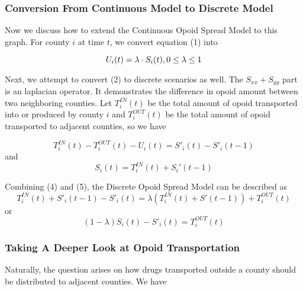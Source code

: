 \subsubsection{Conversion From Continuous Model to Discrete Model}
Now we discuss how to extend the Continuous Opoid Spread Model to this graph. For county $i$ at time $t$, we convert equation (1) into

\begin{equation}
U_i(t) = \lambda\cdot S_i(t), 0\leq \lambda \leq 1 \\
\end{equation}

Next, we attempt to convert (2) to discrete scenarios as well. The $S_{xx}+S_{yy}$ part is an laplacian operator. It demonstrates the difference in opoid amount between two neighboring counties.  Let $T^{IN}_i(t)$ be the total amount of opoid transported into or produced by county $i$ and $T^{OUT}_i(t)$ be the total amount of opoid transported to adjacent counties, so we have

\begin{equation}
T^{IN}_i(t)-T^{OUT}_i(t) - U_i(t)= S'_i(t)-S'_i(t-1)
\end{equation}
and 
\begin{equation}
S_i(t) = T^{IN}_i(t) + S_i'(t-1)
\end{equation}

Combining (4) and (5), the Discrete Opoid Spread Model can be described as
\begin{equation}
T^{IN}_i(t) + S'_i(t-1)-S'_i(t) = \lambda(T^{IN}_i(t) + S'(t-1))+ T^{OUT}_i(t)
\end{equation}
or 
\begin{equation}
(1-\lambda)S_i(t)-S'_i(t) = T^{OUT}_i(t)
\end{equation}

\begin{comment}
\textit{
In the previous subsection, we pointed out that $\lambda$ is a socio-economic factor impling the relationship between opoid usage and opoid storage. In the discrete scenario, we can describe it as
}
\begin{equation}
\lambda = \frac{U_i(t)}{S_i(t)} = \frac{S_i(t) -\sum_{j\in N_i}S_j(t)}{S_i(t)}
\end{equation}
\end{comment}
\subsubsection{Taking A Deeper Look at Opoid Transportation}
Naturally, the question arises on how drugs transported outside a county should be distributed to adjacent counties. We have


